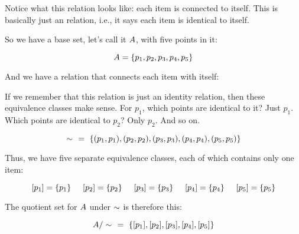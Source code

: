 \documentclass[../../../main.tex]{subfiles}
\begin{document}
\begin{fexample}
\begin{aside}
  \begin{remark}
    Notice what this relation looks like: each item is connected to itself. This is basically just an  relation, i.e., it says each item is identical to itself.
  \end{remark}
\end{aside}

So we have a base set, let's call it $A$, with five points in it:

\begin{equation*}
  A = \{ p_{1}, p_{2}, p_{3}, p_{4}, p_{5} \}
\end{equation*}

And we have a relation that connects each item with itself:

\begin{aside}
  \begin{remark}
    If we remember that this relation is just an identity relation, then these equivalence classes make sense. For $p_{1}$, which points are identical to it? Just $p_{1}$. Which points are identical to $p_{2}$? Only $p_{2}$. And so on.
  \end{remark}
\end{aside}

\begin{equation*}
  \equivalence/~~=~\{ (p_{1}, p_{1}), (p_{2}, p_{2}), (p_{3}, p_{3}), (p_{4}, p_{4}), (p_{5}, p_{5}) \}
\end{equation*}

Thus, we have five separate equivalence classes, each of which contains only one item:

\begin{equation*}
  [p_{1}] = \{ p_{1} \} \hskip 0.5cm 
  [p_{2}] = \{ p_{2} \} \hskip 0.5cm 
  [p_{3}] = \{ p_{3} \} \hskip 0.5cm 
  [p_{4}] = \{ p_{4} \} \hskip 0.5cm 
  [p_{5}] = \{ p_{5} \}
\end{equation*}

The quotient set for $A$ under $\equivalence/$ is therefore this:

\begin{equation*}
  \quotientset{\set{A}}{\equivalence/}~~=~\{
    \equivclass{p_{1}}, \equivclass{p_{2}}, \equivclass{p_{3}}, 
    \equivclass{p_{4}}, \equivclass{p_{5}} \}
\end{equation*}

\end{fexample}
\end{document}

